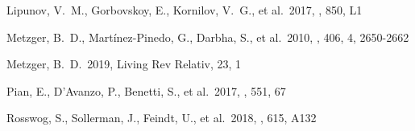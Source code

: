 \documentclass[twocolumn]{aastex63}
\begin{document}
\begin{thebibliography}{}
 Lipunov, V.~M., Gorbovskoy, E., Kornilov, V.~G., et al.\ 2017, \apjl, 850, L1



 Metzger, B.~D., Mart{\'i}nez-Pinedo, G., Darbha, S., et al.\ 2010, \mnras, 406, 4, 2650-2662


 Metzger, B.~D.\ 2019, Living Rev Relativ, 23, 1

 Pian, E., D'Avanzo, P., Benetti, S., et al.\ 2017, \nat, 551, 67




 Rosswog, S., Sollerman, J., Feindt, U., et al.\ 2018, \aap, 615, A132







\end{thebibliography}
\end{document}
